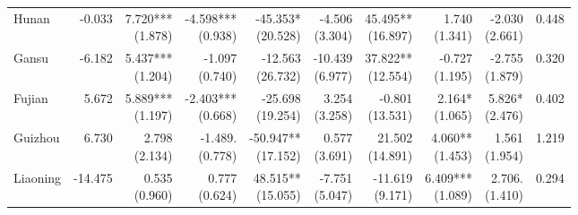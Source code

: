 \documentclass[12pt]{article}
\begin{document}
\begin{landscape}
\begin{small}
\begin{longtable}{lrrrrrrrrr}
    Hunan & -0.033 & \makecell[r]{7.720***\\(1.878)} & \makecell[r]{-4.598***\\(0.938)} & \makecell[r]{-45.353*\\(20.528)} & \makecell[r]{-4.506\\(3.304)} & \makecell[r]{45.495**\\(16.897)} & \makecell[r]{1.740\\(1.341)} & \makecell[r]{-2.030\\(2.661)} & 0.448 \\
    Gansu & -6.182 & \makecell[r]{5.437***\\(1.204)} & \makecell[r]{-1.097\\(0.740)} & \makecell[r]{-12.563\\(26.732)} & \makecell[r]{-10.439\\(6.977)} & \makecell[r]{37.822**\\(12.554)} & \makecell[r]{-0.727\\(1.195)} & \makecell[r]{-2.755\\(1.879)} & 0.320 \\
    Fujian & 5.672 & \makecell[r]{5.889***\\(1.197)} & \makecell[r]{-2.403***\\(0.668)} & \makecell[r]{-25.698\\(19.254)} & \makecell[r]{3.254\\(3.258)} & \makecell[r]{-0.801\\(13.531)} & \makecell[r]{2.164*\\(1.065)} & \makecell[r]{5.826*\\(2.476)} & 0.402 \\
    Guizhou & 6.730 & \makecell[r]{2.798\\(2.134)} & \makecell[r]{-1.489.\\(0.778)} & \makecell[r]{-50.947**\\(17.152)} & \makecell[r]{0.577\\(3.691)} & \makecell[r]{21.502\\(14.891)} & \makecell[r]{4.060**\\(1.453)} & \makecell[r]{1.561\\(1.954)} & 1.219 \\
    Liaoning & -14.475 & \makecell[r]{0.535\\(0.960)} & \makecell[r]{0.777\\(0.624)} & \makecell[r]{48.515**\\(15.055)} & \makecell[r]{-7.751\\(5.047)} & \makecell[r]{-11.619\\(9.171)} & \makecell[r]{6.409***\\(1.089)} & \makecell[r]{2.706.\\(1.410)} & 0.294 \\

\end{longtable}
\end{small}
\end{landscape}
\end{document}
